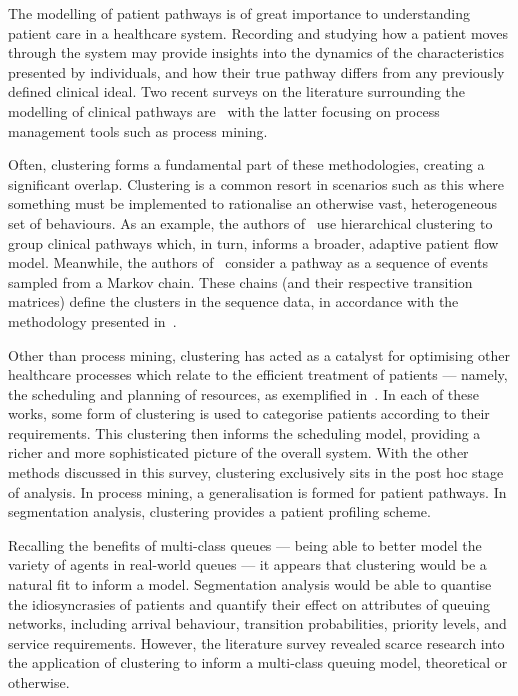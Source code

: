 The modelling of patient pathways is of great importance to understanding
patient care in a healthcare system. Recording and studying how a patient moves
through the system may provide insights into the dynamics of the characteristics
presented by individuals, and how their true pathway differs from any previously
defined clinical ideal. Two recent surveys on the literature surrounding the
modelling of clinical pathways are~\cite{Aspland2019,DeRamonFernandez2019} with
the latter focusing on process management tools such as process mining.

Often, clustering forms a fundamental part of these methodologies, creating a
significant overlap. Clustering is a common resort in scenarios such as
this where something must be implemented to rationalise an otherwise vast,
heterogeneous set of behaviours. As an example, the authors
of~\cite{Prokofyeva2020} use hierarchical clustering to group clinical pathways
which, in turn, informs a broader, adaptive patient flow model. Meanwhile, the
authors of~\cite{Rebuge2012} consider a pathway as a sequence of events sampled
from a Markov chain. These chains (and their respective transition matrices)
define the clusters in the sequence data, in accordance with the methodology
presented in~\cite{Cadez2000}.

Other than process mining, clustering has acted as a catalyst for optimising
other healthcare processes which relate to the efficient treatment of patients
--- namely, the scheduling and planning of resources, as exemplified
in~\cite{Nasir2018,Steins2013,Yousefi2020}. In each of these works, some form of
clustering is used to categorise patients according to their requirements. This
clustering then informs the scheduling model, providing a richer and more
sophisticated picture of the overall system. With the other methods discussed in
this survey, clustering exclusively sits in the post hoc stage of analysis. In
process mining, a generalisation is formed for patient pathways. In segmentation
analysis, clustering provides a patient profiling scheme.

Recalling the benefits of multi-class queues --- being able to better model the
variety of agents in real-world queues --- it appears that clustering would be a
natural fit to inform a model. Segmentation analysis would be able to quantise
the idiosyncrasies of patients and quantify their effect on attributes of
queuing networks, including arrival behaviour, transition probabilities,
priority levels, and service requirements. However, the literature survey
revealed scarce research into the application of clustering to inform a
multi-class queuing model, theoretical or otherwise.


